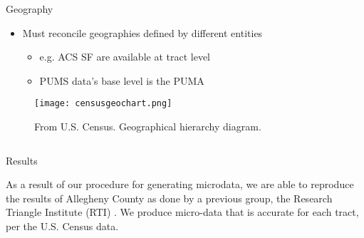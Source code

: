 \documentclass[final]{beamer}
\newlength{\onecolwid}
\newlength{\twocolwid}
\begin{document}
\begin{frame}[t]
\begin{columns}[t]
\begin{column}{\twocolwid}
\begin{columns}[t,totalwidth=\twocolwid]
\begin{column}{\onecolwid}\vspace{-.6in} %


\begin{block}{Geography}
\begin{itemize}
\item Must reconcile geographies defined by different entities
\begin{itemize}
\item e.g. ACS SF are available at tract level
\item PUMS data's base level is the PUMA
\end{itemize}
\end{itemize}
\begin{figure}\label{geohier}
\texttt{[image: censusgeochart.png]}
\caption{From U.S. Census.  Geographical hierarchy diagram.}
\end{figure}

\end{block}


\end{column} %

\end{columns} %


\begin{alertblock}{Results}

As a result of our procedure for generating microdata, we are able to reproduce the results of Allegheny County as done by a previous group, the Research Triangle Institute (RTI) \cite{rtisynthpopv1}.  We produce micro-data that is accurate for each tract, per the U.S. Census data.
\end{alertblock} 



\end{column}
\end{columns}
\end{frame}
\end{document}
